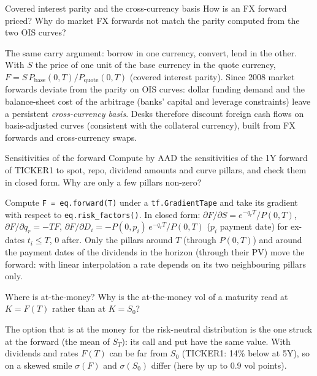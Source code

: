 \begin{question}{\Theory {}}{Covered interest parity and the cross-currency basis}
How is an FX forward priced? Why do market FX forwards not match the parity computed from the two OIS curves?
\end{question}
\begin{answer}
The same carry argument: borrow in one currency, convert, lend in the other. With $S$ the price of one unit of the base
currency in the quote currency, $F = S\,P_{\text{base}}(0,T)/P_{\text{quote}}(0,T)$ (covered interest parity). Since
2008 market forwards deviate from the parity on OIS curves: dollar funding demand and the balance-sheet cost of the
arbitrage (banks' capital and leverage constraints) leave a persistent \emph{cross-currency basis}. Desks therefore
discount foreign cash flows on basis-adjusted curves (consistent with the collateral currency), built from FX forwards
and cross-currency swaps.
\end{answer}

\begin{question}{\Practice {}}{Sensitivities of the forward}
Compute by AAD the sensitivities of the 1Y forward of TICKER1 to spot, repo, dividend amounts and curve pillars, and
check them in closed form. Why are only a few pillars non-zero? 
\end{question}
\begin{answer}
Compute \texttt{F = eq.forward(T)} under a \texttt{tf.GradientTape} and take its gradient with respect to
\texttt{eq.risk\_factors()}. In closed form: $\partial F/\partial S = e^{-q_r T}/P(0,T)$, $\partial F/\partial q_r = -T F$,
$\partial F/\partial D_i = -P(0,p_i)\,e^{-q_r T}/P(0,T)$ ($p_i$ payment date) for ex-dates $t_i \le T$, 0 after. Only
the pillars around $T$ (through
$P(0,T)$) and around the payment dates of the dividends in the horizon (through their PV) move the forward: with linear
interpolation a rate depends on its two neighbouring pillars only.
\end{answer}

\begin{question}{\Theory {}}{Where is at-the-money?}
Why is the at-the-money vol of a maturity read at $K = F(T)$ rather than at $K = S_0$?
\end{question}
\begin{answer}
The option that is at the money for the risk-neutral distribution is the one struck at the forward (the mean of
$S_T$): its call and put have the same value. With dividends and rates $F(T)$ can be far from $S_0$ (TICKER1: 14\%
below at 5Y), so on a skewed smile $\sigma(F)$ and $\sigma(S_0)$ differ (here by up to 0.9 vol points).
\end{answer}

